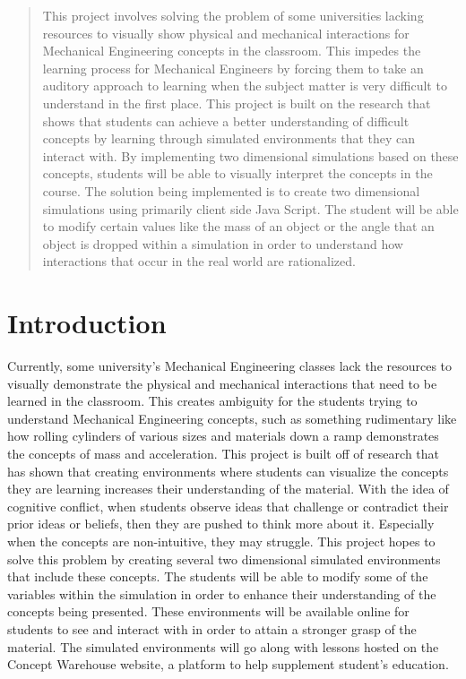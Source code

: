 \documentclass[capstone.tex]{subfiles}
\begin{document}
\begin{titlepage}
\begin{singlespace}
\begin{abstract}
        This project involves solving the problem of some universities lacking resources to visually show physical and mechanical interactions for Mechanical Engineering concepts in the classroom. This impedes the learning process for Mechanical Engineers by forcing them to take an auditory approach to learning when the subject matter is very difficult to understand in the first place. This project is built on the research that shows that students can achieve a better understanding of difficult concepts by learning through simulated environments that they can interact with. By implementing two dimensional simulations based on these concepts, students will be able to visually interpret the concepts in the course. The solution being implemented is to create two dimensional simulations using primarily client side Java Script. The student will be able to modify certain values like the mass of an object or the angle that an object is dropped within a simulation in order to understand how interactions that occur in the real world are rationalized.     
        \end{abstract}     
    \end{singlespace}
\end{titlepage}
\newpage
\clearpage
{}

\newpage

\section{Introduction}

Currently, some university's Mechanical Engineering classes lack the resources to visually demonstrate the physical and mechanical interactions that need to be learned in the classroom. This creates ambiguity for the students trying to understand Mechanical Engineering concepts, such as something rudimentary like how rolling cylinders of various sizes and materials down a ramp demonstrates the concepts of mass and acceleration. This project is built off of research that has shown that creating environments where students can visualize the concepts they are learning increases their understanding of the material. With the idea of cognitive conflict, when students observe ideas that challenge or contradict their prior ideas or beliefs, then they are pushed to think more about it. Especially when the concepts are non-intuitive, they may struggle. This project hopes to solve this problem by creating several two dimensional simulated environments that include these concepts. The students will be able to modify some of the variables within the simulation in order to enhance their understanding of the concepts being presented. These environments will be available online for students to see and interact with in order to attain a stronger grasp of the material. The simulated environments will go along with lessons hosted on the Concept Warehouse website, a platform to help supplement student's education. 
\end{document}
